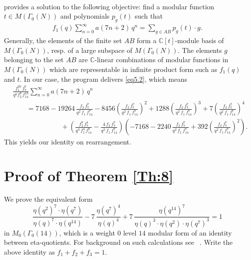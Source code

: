 \documentclass{article}
\begin{document}
\begin{enumerate}
\begin{align}
\end{align}
provides a solution to the following objective: 
find a modular function $t \in M(\Gamma_0(N))$ and
polynomials $p_g(t)$ such that
\begin{align}
    f_1(q)\sum_{n=0}^\infty a(7n+2)\,q^n  = \sum_{g\in AB} p_g(t)\cdot g.
\end{align}
Generally, the elements of the finite set $AB$ form a $\mathbb C[t]$-module basis of $M(\Gamma_0(N))$,
resp. of a large subspace of $M(\Gamma_0(N))$. 
The elements $g$ belonging to the set $AB$ are $\mathbb C$-linear combinations
of modular functions in $M(\Gamma_0(N))$ which are representable in infinite product form such
as $f_1(q)$ and $t$.
 In our case, the program delivers \eqref{eq5.2}, which
means
\begin{align*}
     & \frac{f_1^{20}\, f_7^7}{q^8 f_{2}^8\, f_{14}^{18}} \sum_{n=0}^\infty a(7n+2)\,q^n \\
     & \qquad = 7168 - 19264\, \frac{f_2\, f_7^7}{q^2\, f_1\, f_{14}^7} - 8456 \left( \frac{f_2\, f_7^7}{q^2\, f_1\, f_{14}^7} \right)^2 + 1288 \left( \frac{f_2\, f_7^7}{q^2\, f_1\, f_{14}^7} \right)^3 + 7 \left( \frac{f_2\, f_7^7}{q^2\, f_1\, f_{14}^7} \right)^4\\
     & \qquad\qquad\qquad\quad + \left( \frac{f_2^8\, f_7^4}{q^3\, f_1^4\, f_{14}^8} - \frac{4\,f_2\, f_7^7 }{q^2\, f_1\, f_{14}^7} \right) \left(-7168 - 2240\,\frac{f_2\, f_7^7}{q^2\, f_1\, f_{14}^7} + 392 \left( \frac{f_2\, f_7^7}{q^2\, f_1\, f_{14}^7} \right)^2 \right).
\end{align*}
This yields our identity on rearrangement.
\end{enumerate}


\section{Proof of Theorem \ref{Th:8}} \label{S6}
We prove the equivalent form 
$$\frac{\eta(q^2)^7\cdot \eta(q^7)}{\eta(q)^7\cdot \eta(q^{14})} - 7\, \frac{\eta(q^{7})^4}{\eta(q)^4}+7\, \frac{\eta(q^{14})^7}{\eta(q)^3\cdot\eta(q^2)\cdot\eta(q^7)^3}=1$$
in $M_0(\Gamma_0(14))$, which is a weight $0$ level $14$ modular form of an identity between eta-quotients. For background on such calculations see ~\cite[p. 18]{Ono04}.
Write the above identity as $f_1+f_2+f_3=1$.
\end{document}
